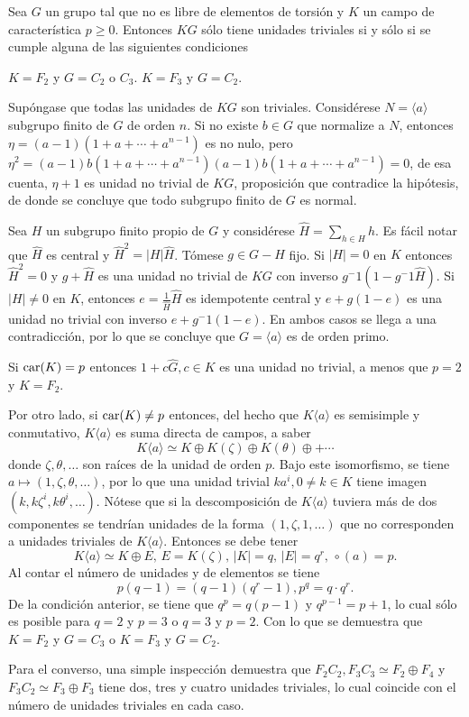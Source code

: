 \begin{proposicion}\label{prop:UnidadesTriviales}
Sea $G$ un grupo tal que no es libre de elementos de torsión y $K$ un campo de característica $p\geq 0$. Entonces $KG$ sólo tiene unidades triviales si y sólo si se cumple alguna de las siguientes condiciones
\begin{bulletList}
\newItem $K=F_2$ y $G=C_2$ o $C_3$.
\newItem $K=F_3$ y $G=C_2$.
\end{bulletList}
\end{proposicion}
\begin{proof*}
Supóngase que todas las unidades de $KG$ son triviales. Considérese $N=\langle a \rangle$ subgrupo finito de $G$ de orden $n$. Si no existe $b \in G$ que normalize a $N$, entonces $\eta = (a-1)(1+a+\cdots + a^{n-1})$ es no nulo, pero $\eta^2 = (a-1)b(1+a+\cdots+a^{n-1})(a-1)b(1+a+\cdots+a^{n-1})=0$, de esa cuenta, $\eta +1$ es unidad no trivial de $KG$, proposición que contradice la hipótesis, de donde se concluye que todo subgrupo finito de $G$ es normal.

Sea $H$ un subgrupo finito propio de $G$ y considérese $\hat{H} = \sum_{h \in H}h$. Es fácil notar que  $\hat{H}$ es central y $\hat{H}^2 = |H|\hat{H} $. Tómese $g \in G-H$ fijo. Si $|H| =0$ en $K$ entonces $\hat{H}^2 = 0$ y $g + \hat{H}$ es una unidad no trivial de $KG$ con inverso $g^-1(1-g^-1\hat{H})$. Si $|H| \neq 0$ en $K$, entonces $e = \frac{1}{\hat{H}}\hat{H}$ es idempotente central y $e +g(1-e)$ es una unidad no trivial con inverso $e+g^-1(1-e)$. En ambos casos se llega a una contradicción, por lo que se concluye que $G = \langle a \rangle$ es de orden primo.

Si $\operatorname{car} (K) = p$ entonces $1+c\hat{G}, c \in K$ es una unidad no trivial, a menos que $p=2$ y $K=F_2$. 

Por otro lado, si $\operatorname{car}(K) \neq p$ entonces, del hecho que $K\langle a \rangle$ es semisimple y conmutativo, $K\langle a \rangle$ es suma directa de campos, a saber
\[ K \langle a \rangle \simeq K\oplus K(\zeta) \oplus K(\theta) \oplus + \cdots \] donde $\zeta, \theta, \dots$ son raíces de la unidad de orden $p$. Bajo este isomorfismo, se tiene $a \mapsto (1,\zeta,\theta,\dots)$, por lo que una unidad trivial $ka^ i, 0\neq k \in K$ tiene imagen $(k,k\zeta^i,k\theta^i,\dots)$. Nótese que si la descomposición de $K\langle a\rangle$ tuviera más de dos componentes se tendrían unidades de la forma $(1,\zeta,1,\dots)$ que no corresponden a unidades triviales de $K\langle a \rangle$.
Entonces se debe tener \[ K\langle a \rangle \simeq K \oplus E\mbox{, } E = K(\zeta)\mbox{, } |K|=q\mbox{, } |E|=q^r\mbox{, } \circ(a) = p. \] Al contar el número de unidades y de elementos se tiene \[ p(q-1) = (q-1)(q^r-1), p^q = q\cdot q^r. \] De la condición anterior, se tiene que $q^p = q(p-1)$ y $q^{p-1} = p+1$, lo cual sólo es posible para $q=2$ y $p=3$ o $q=3$ y $p=2$. Con lo que se demuestra que $K=F_2$ y $G=C_3$ o $K=F_3$ y $G=C_2$.

Para el converso, una simple inspección demuestra que $F_2C_2, F_3C_3 \simeq F_2\oplus F_4$ y $F_3C_2 \simeq F_3 \oplus F_3$ tiene dos, tres y cuatro unidades triviales, lo cual coincide con el número de unidades triviales en cada caso. 
\end{proof*}

